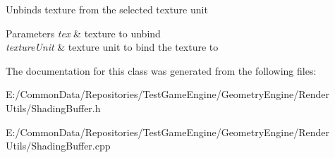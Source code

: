 Unbinds texture from the selected texture unit 
\begin{DoxyParams}{Parameters}
{\em tex} & texture to unbind \\
\hline
{\em texture\+Unit} & texture unit to bind the texture to \\
\hline
\end{DoxyParams}


The documentation for this class was generated from the following files\+:\begin{DoxyCompactItemize}
\item 
E\+:/\+Common\+Data/\+Repositories/\+Test\+Game\+Engine/\+Geometry\+Engine/\+Render Utils/Shading\+Buffer.\+h\item 
E\+:/\+Common\+Data/\+Repositories/\+Test\+Game\+Engine/\+Geometry\+Engine/\+Render Utils/Shading\+Buffer.\+cpp\end{DoxyCompactItemize}

